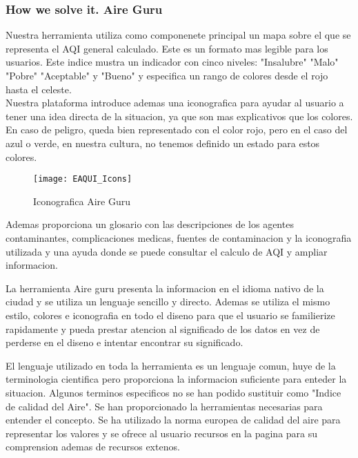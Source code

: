 \subsubsection{How we solve it. Aire Guru} 
Nuestra herramienta utiliza como componenete principal un mapa sobre el que se representa el AQI general calculado. Este es un formato 
mas legible para los usuarios. Este indice mustra un indicador con cinco niveles: "Insalubre" "Malo" "Pobre" "Aceptable" y "Bueno" y 
especifica un rango de colores desde el rojo hasta el celeste.\\
Nuestra plataforma introduce ademas una iconografica para ayudar al usuario a tener una idea directa de la situacion, ya que son mas 
explicativos que los colores. En caso de peligro, queda bien representado con el color rojo, pero en el caso del azul o verde, en nuestra cultura, no
tenemos definido un estado para estos colores.\\
\begin{figure}[ht]
    \centering
    \texttt{[image: EAQUI\_Icons]}
    \caption{Iconografica Aire Guru}
\end{figure}

Ademas proporciona un glosario con las descripciones de los agentes contaminantes, complicaciones medicas, fuentes de contaminacion
y la iconografia utilizada y una ayuda donde se puede consultar el calculo de AQI y ampliar informacion.

La herramienta Aire guru presenta la informacion en el idioma nativo de la ciudad y se utiliza un lenguaje sencillo y directo.
Ademas se utiliza el mismo estilo, colores e iconografia en todo el diseno para que el usuario se familierize rapidamente y pueda
prestar atencion al significado de los datos en vez de perderse en el diseno e intentar encontrar su significado.
 
\begin{itemize}
    \done El lenguaje utilizado en toda la herramienta es un lenguaje comun, huye de la terminologia cientifica pero proporciona la informacion
    suficiente para enteder la situacion.
    \crossed Algunos terminos especificos no se han podido sustituir como "Indice de calidad del Aire".
    \done Se han proporcionado la herramientas necesarias para entender el concepto. Se ha utilizado la norma europea de calidad del aire para 
    representar los valores y se ofrece al usuario recursos en la pagina para su comprension ademas de recursos extenos.
    
\end{itemize}
 

\newpage